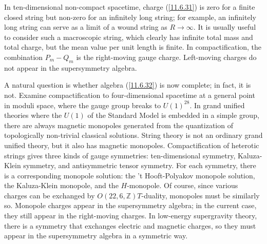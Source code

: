 In ten-dimensional non-compact spacetime, charge (\ref{11.6.31}) is zero for a finite closed string but non-zero for an infinitely long string; for example, an infinitely long string can serve as a limit of a wound string as $R\to\infty$. It is usually useful to consider such a macroscopic string, which clearly has infinite total mass and total charge, but the mean value per unit length is finite. In compactification, the combination $P_{m}-Q_{m}$ is the right-moving gauge charge. Left-moving charges do not appear in the supersymmetry algebra.

A natural question is whether algebra (\ref{11.6.32}) is now complete; in fact, it is not. Examine compactification to four-dimensional spacetime at a general point in moduli space, where the gauge group breaks to $U(1)^{28}$. In grand unified theories where the $U(1)$ of the Standard Model is embedded in a simple group, there are always magnetic monopoles generated from the quantization of topologically non-trivial classical solutions. String theory is not an ordinary grand unified theory, but it also has magnetic monopoles. Compactification of heterotic strings gives three kinds of gauge symmetries: ten-dimensional symmetry, Kaluza-Klein symmetry, and antisymmetric tensor symmetry. For each symmetry, there is a corresponding monopole solution: the 't Hooft-Polyakov monopole solution, the Kaluza-Klein monopole, and the $H$-monopole. Of course, since various charges can be exchanged by $O(22,6,\mathds{Z}) T$-duality, monopoles must be similarly so. Monopole charges appear in the supersymmetry algebra; in the current case, they still appear in the right-moving charges. In low-energy supergravity theory, there is a symmetry that exchanges electric and magnetic charges, so they must appear in the supersymmetry algebra in a symmetric way.